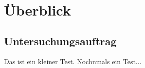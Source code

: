 \chapter{Überblick}
\section{Untersuchungsauftrag}
\label{section:untersuchungsauftrag}
Das ist ein kleiner Test.
Nochnmals ein Test...
